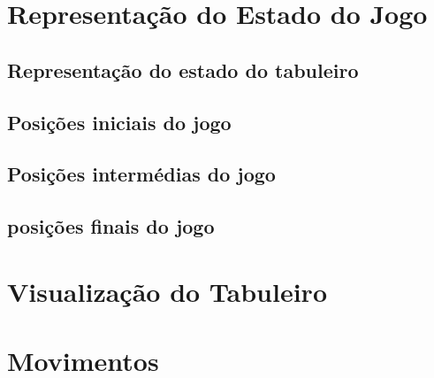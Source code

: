 \documentclass[a4paper]{article}
\begin{document}




\section{Representação do Estado do Jogo}

\subsection{Representação do estado do tabuleiro}



\subsection{Posições iniciais do jogo}
\subsection{Posições intermédias do jogo}
\subsection{posições finais do jogo}



\section{Visualização do Tabuleiro}




\section{Movimentos}
\end{document}

